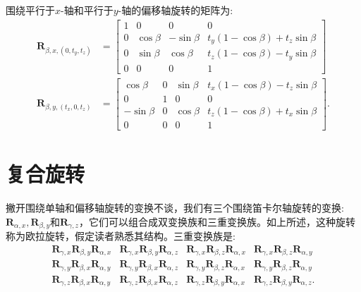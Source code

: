 围绕平行于$x$-轴和平行于$y$-轴的偏移轴旋转的矩阵为:
$$
\begin{aligned}
\mathbf{R}_{\beta, x,\left(0, t_{y}, t_{z}\right)} & =\left[\begin{array}{cccc}
1 & 0 & 0 & 0 \\
0 & \cos \beta & -\sin \beta & t_{y}(1-\cos \beta)+t_{z} \sin \beta \\
0 & \sin \beta & \cos \beta & t_{z}(1-\cos \beta)-t_{y} \sin \beta \\
0 & 0 & 0 & 1
\end{array}\right] \\
\mathbf{R}_{\beta, y,\left(t_{x}, 0, t_{z}\right)} & =\left[\begin{array}{cccc}
\cos \beta & 0 & \sin \beta & t_{x}(1-\cos \beta)-t_{z} \sin \beta \\
0 & 1 & 0 & 0 \\
-\sin \beta & 0 & \cos \beta & t_{z}(1-\cos \beta)+t_{x} \sin \beta \\
0 & 0 & 0 & 1
\end{array}\right] .
\end{aligned}
$$

\section{复合旋转}
撇开围绕单轴和偏移轴旋转的变换不谈，我们有三个围绕笛卡尔轴旋转的变换:$\mathbf{R}_{\alpha, x}, \mathbf{R}_{\beta, y}$和$\mathbf{R}_{\gamma, z}$，它们可以组合成双变换族和三重变换族。如上所述，这种旋转称为欧拉旋转，假定读者熟悉其结构。三重变换族是:
$$
\begin{array}{llll}
\mathbf{R}_{\gamma, x} \mathbf{R}_{\beta, y} \mathbf{R}_{\alpha, x} & \mathbf{R}_{\gamma, x} \mathbf{R}_{\beta, y} \mathbf{R}_{\alpha, z} & \mathbf{R}_{\gamma, x} \mathbf{R}_{\beta, z} \mathbf{R}_{\alpha, x} & \mathbf{R}_{\gamma, x} \mathbf{R}_{\beta, z} \mathbf{R}_{\alpha, y} \\
\mathbf{R}_{\gamma, y} \mathbf{R}_{\beta, x} \mathbf{R}_{\alpha, y} & \mathbf{R}_{\gamma, y} \mathbf{R}_{\beta, x} \mathbf{R}_{\alpha, z} & \mathbf{R}_{\gamma, y} \mathbf{R}_{\beta, z} \mathbf{R}_{\alpha, x} & \mathbf{R}_{\gamma, y} \mathbf{R}_{\beta, z} \mathbf{R}_{\alpha, y} \\
\mathbf{R}_{\gamma, z} \mathbf{R}_{\beta, x} \mathbf{R}_{\alpha, y} & \mathbf{R}_{\gamma, z} \mathbf{R}_{\beta, x} \mathbf{R}_{\alpha, z} & \mathbf{R}_{\gamma, z} \mathbf{R}_{\beta, y} \mathbf{R}_{\alpha, x} & \mathbf{R}_{\gamma, z} \mathbf{R}_{\beta, y} \mathbf{R}_{\alpha, z} .
\end{array}
$$

